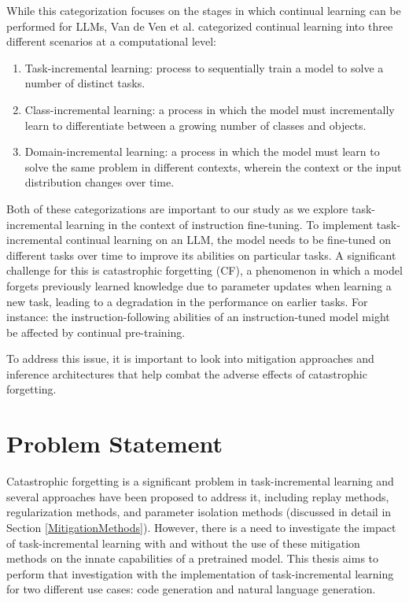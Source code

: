 While this categorization focuses on the stages in which continual learning can be performed for LLMs, Van de Ven et al. \cite{van2022three} categorized continual learning into three different scenarios  at a computational level: 
\begin{enumerate}
    \item Task-incremental learning: process to sequentially train a model to solve a number of distinct tasks.
    \item Class-incremental learning: a process in which the model must incrementally learn to differentiate between a growing number of classes and objects.
    \item Domain-incremental learning: a process in which the model must learn to solve the same problem in different contexts, wherein the context or the input distribution changes over time.
\end{enumerate}

Both of these categorizations are important to our study as we explore task-incremental learning in the context of instruction fine-tuning. To implement task-incremental continual learning on an LLM, the model needs to be fine-tuned on different tasks over time to improve its abilities on particular tasks. A significant challenge for this is catastrophic forgetting (CF), a phenomenon in which a model forgets previously learned knowledge due to parameter updates when learning a new task, leading to a degradation in the performance on earlier tasks. For instance: the instruction-following abilities of an instruction-tuned model might be affected by continual pre-training. 

To address this issue, it is important to look into mitigation approaches and inference architectures that help combat the adverse effects of catastrophic forgetting. 


\section{Problem Statement}
Catastrophic forgetting is a significant problem in task-incremental learning and several approaches have been proposed to address it, including replay methods, regularization methods, and parameter isolation methods (discussed in detail in Section \ref{MitigationMethods}). However, there is a need to investigate the impact of task-incremental learning with and without the use of these mitigation methods on the innate capabilities of a pretrained model. This thesis aims to perform that investigation with the implementation of task-incremental learning for two different use cases: code generation and natural language generation.

